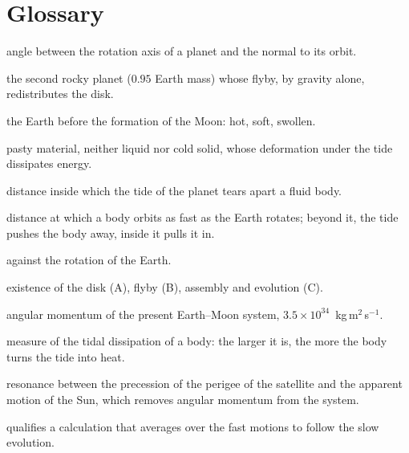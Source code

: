 \documentclass[11pt,a4paper]{article}
\newcommand{\LEM}{\ensuremath{L_{\rm EM}}}
\begin{document}
\section{Glossary}

\begin{description}[leftmargin=3.2cm,style=nextline,itemsep=2pt]
\item[Obliquity] angle between the rotation axis of a planet and the normal to its orbit.
\item[Planet~$B$] the second rocky planet ($0.95$ Earth mass) whose flyby, by gravity alone, redistributes the disk.
\item[Proto-Earth] the Earth before the formation of the Moon: hot, soft, swollen.
\item[Soft body] pasty material, neither liquid nor cold solid, whose deformation under the tide dissipates energy.
\item[Roche limit] distance inside which the tide of the planet tears apart a fluid body.
\item[Corotation radius] distance at which a body orbits as fast as the Earth rotates; beyond it, the tide pushes the body away, inside it pulls it in.
\item[Retrograde] against the rotation of the Earth.
\item[Phases A, B, C] existence of the disk (A), flyby (B), assembly and evolution (C).
\item[$\LEM$] angular momentum of the present Earth--Moon system, $3.5\times10^{34}$~kg\,m$^2$\,s$^{-1}$.
\item[$k_2/Q$] measure of the tidal dissipation of a body: the larger it is, the more the body turns the tide into heat.
\item[Evection] resonance between the precession of the perigee of the satellite and the apparent motion of the Sun, which removes angular momentum from the system.
\item[Secular] qualifies a calculation that averages over the fast motions to follow the slow evolution.
\end{description}



\end{document}
